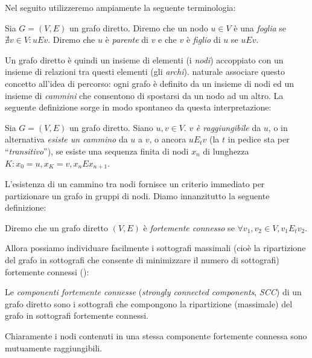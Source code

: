 Nel seguito utilizzeremo ampiamente la seguente terminologia:
\begin{definition}
    Sia $G = (V,E)$ un grafo diretto. Diremo che un nodo $u \in V$ è una \emph{foglia} se $\nexists v \in V : u E v$. Diremo che $u$ è \emph{parente} di $v$ e che $v$ è \emph{figlio} di $u$ se $uEv$.
\end{definition}
Un grafo diretto è quindi un insieme di elementi (i \emph{nodi}) accoppiato con un insieme di relazioni tra questi elementi (gli \emph{archi}). \accente naturale associare questo concetto all'idea di percorso: ogni grafo è definito da un insieme di nodi ed un insieme di \emph{cammini} che consentono di spostarsi da un nodo ad un altro. La seguente definizione sorge in modo spontaneo da questa interpretazione:
\begin{definition}
    Sia $G = (V, E)$ un grafo diretto. Siano $u,v \in V$. $v$ \emph{è raggiungibile} da $u$, o in alternativa \emph{esiste un cammino} da $u$ a $v$, o ancora $u E_t v$ (la $t$ in pedice sta per ``\emph{transitivo}''), se esiste una sequenza finita di nodi $x_n$ di lunghezza $K : x_0 = u, x_K = v, x_n E x_{n+1}$.
\end{definition}
L'esistenza di un cammino tra nodi fornisce un criterio immediato per partizionare un grafo in gruppi di nodi. Diamo innanzitutto la seguente definizione:
\begin{definition}
    Diremo che un grafo diretto $(V,E)$ è \emph{fortemente connesso} se $\forall v_1, v_2 \in V, v_1 E_t v_2$.
\end{definition}
Allora possiamo individuare facilmente i sottografi massimali (cioè la ripartizione del grafo in sottografi che consente di minimizzare il numero di sottografi) fortemente connessi (\hspace*{-0.1cm}\cite[Appendice B]{clrs}):
\begin{definition}
    Le \emph{componenti fortemente connesse} (\emph{strongly connected components}, \emph{SCC}) di un grafo diretto sono i sottografi che compongono la ripartizione (massimale) del grafo in sottografi fortemente connessi.
\end{definition}
\begin{observation}
    Chiaramente i nodi contenuti in una stessa componente fortemente connessa sono mutuamente raggiungibili.
\end{observation}

